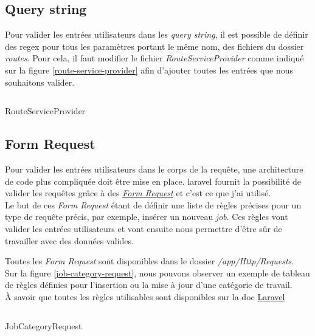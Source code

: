 \documentclass[
    iai, %
    il, %
]{heig-tb}
\begin{document}
\subsection{Query string}
Pour valider les entrées utilisateurs dans les \emph{query string}, il est possible de définir des \Gls{regex} pour tous les paramètres portant le même nom, des fichiers du dossier \emph{routes}.
Pour cela, il faut modifier le fichier \emph{RouteServiceProvider} comme indiqué sur la figure \ref{route-service-provider} afin d'ajouter toutes les entrées que nous souhaitons valider.

\begin{listing}[h]
    \inputminted{php}{assets/code/RouteServiceProvider.php}
    \caption{RouteServiceProvider \label{route-service-provider}}
\end{listing}

\subsection{Form Request}
Pour valider les entrées utilisateurs dans le corps de la requête, une architecture de code plus compliquée doit être mise en place. \Gls{laravel} fournit la possibilité de valider les requêtes grâce à des \href{https://laravel.com/docs/9.x/validation#form-request-validation}{\emph{Form Request}} et c'est ce que j'ai utilisé. \\
Le but de ces \emph{Form Request} étant de définir une liste de règles précises pour un type de requête précis, par exemple, insérer un nouveau \emph{job}. Ces règles vont valider les entrées utilisateurs et vont ensuite nous permettre d'être sûr de travailler avec des données valides.

Toutes les \emph{Form Request} sont disponibles dans le dossier \emph{/app/Http/Requests}. \\
Sur la figure \ref{job-category-request}, nous pouvons observer un exemple de tableau de règles définies pour l'insertion ou la mise à jour d'une catégorie de travail. \\
À savoir que toutes les règles utilisables sont disponibles sur la doc \href{https://laravel.com/docs/9.x/validation#available-validation-rules}{Laravel}

\begin{listing}[h]
    \inputminted{php}{assets/code/JobCategoryRequest.php}
    \caption{JobCategoryRequest \label{job-category-request}}
\end{listing}

\newpage
\end{document}
